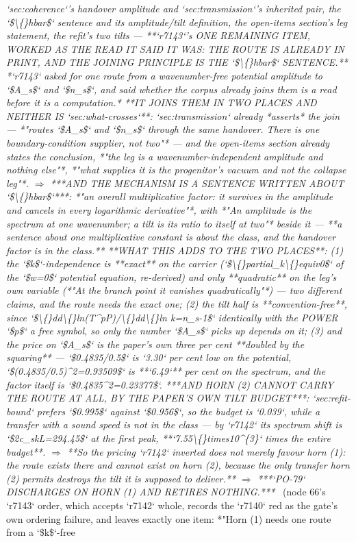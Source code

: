 \begin{description}
\textit{`sec:coherence`'s handover amplitude and `sec:transmission`'s inherited pair, the `\$\textbackslash\{\}hbar\$` sentence and its amplitude/tilt definition, the open-items section's leg statement, the refit's two tilts ---  **`r7143`'s ONE REMAINING ITEM, WORKED AS THE READ IT SAID IT WAS: THE ROUTE IS ALREADY IN PRINT, AND THE JOINING PRINCIPLE IS THE `\$\textbackslash\{\}hbar\$` SENTENCE.** *`r7143` asked for one route from a wavenumber-free potential amplitude to `\$A\_s\$` and `\$n\_s\$`, and said whether the corpus already joins them is a read before it is a computation.*  **IT JOINS THEM IN TWO PLACES AND NEITHER IS `sec:what-crosses`**: `sec:transmission` already *asserts* the join --- *"routes `\$A\_s\$` and `\$n\_s\$` through the same handover. There is one boundary-condition supplier, not two"* --- and the open-items section already states the conclusion, *"the leg is a wavenumber-independent amplitude and nothing else"*, *"what supplies it is the progenitor's vacuum and not the collapse leg"*. \ensuremath{\Rightarrow} ***AND THE MECHANISM IS A SENTENCE WRITTEN ABOUT `\$\textbackslash\{\}hbar\$`***: *"an overall multiplicative factor: it survives in the amplitude and cancels in every logarithmic derivative"*, with *"An amplitude is the spectrum at one wavenumber; a tilt is its ratio to itself at two"* beside it --- **a sentence about one multiplicative constant is about the class, and the handover factor is in the class.**  **WHAT THIS ADDS TO THE TWO PLACES**: (1) the `\$k\$`-independence is **exact** on the carrier (`\$\textbackslash\{\}partial\_k\textbackslash\{\}equiv0\$` of the `\$w=0\$` potential equation, re-derived) and only **quadratic** on the leg's own variable (*"At the branch point it vanishes quadratically"*) --- two different claims, and the route needs the exact one; (2) the tilt half is **convention-free**, since `\$\textbackslash\{\}dd\textbackslash\{\}ln(T\textasciicircum{}pP)/\textbackslash\{\}dd\textbackslash\{\}ln k=n\_s-1\$` identically with the POWER `\$p\$` a free symbol, so only the number `\$A\_s\$` picks up depends on it; (3) and the price on `\$A\_s\$` is the paper's own three per cent **doubled by the squaring** --- `\$0.4835/0.5\$` is `3.30` per cent low on the potential, `\$(0.4835/0.5)\textasciicircum{}2=0.93509\$` is **`6.49`** per cent on the spectrum, and the factor itself is `\$0.4835\textasciicircum{}2=0.23377\$`.  ***AND HORN (2) CANNOT CARRY THE ROUTE AT ALL, BY THE PAPER'S OWN TILT BUDGET***: `sec:refit-bound` prefers `\$0.995\$` against `\$0.956\$`, so the budget is `0.039`, while a transfer with a sound speed is not in the class --- by `r7142` its spectrum shift is `\$2c\_skL=294.45\$` at the first peak, **`7.55\textbackslash\{\}times10\textasciicircum{}\{3\}` times the entire budget**. \ensuremath{\Rightarrow} **So the pricing `r7142` inverted does not merely favour horn (1): the route exists there and cannot exist on horn (2), because the only transfer horn (2) permits destroys the tilt it is supposed to deliver.** \ensuremath{\Rightarrow} ***`PO-79` DISCHARGES ON HORN (1) AND RETIRES NOTHING.***} \ (node 66's `r7143` order, which accepts `r7142` whole, records the `r7140` red as the gate's own ordering failure, and leaves exactly one item: *"Horn (1) needs one route from a `\$k\$`-free 
\end{description}
